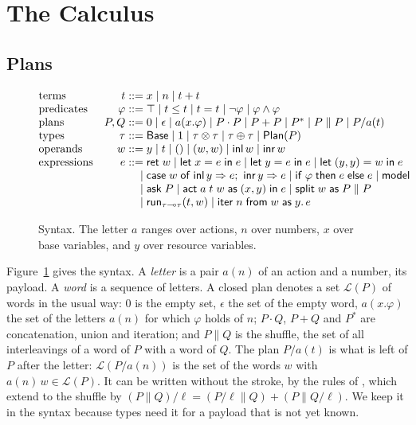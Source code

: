 \documentclass[acmsmall,nonacm,screen]{acmart}
\newcommand{\kw}[1]{\mathsf{#1}}
\newcommand{\Base}{\kw{Base}}
\newcommand{\Plan}[1]{\kw{Plan}(#1)}
\newcommand{\ret}{\kw{ret}\;}
\newcommand{\model}{\kw{model}}
\newcommand{\letin}[3]{\kw{let}\;#1 = #2\;\kw{in}\;#3}
\newcommand{\ite}[3]{\kw{if}\;#1\;\kw{then}\;#2\;\kw{else}\;#3}
\newcommand{\ask}[1]{\kw{ask}\;#1}
\newcommand{\act}[5]{\kw{act}\;#1\;#2\;#3\;\kw{as}\;(#4)\;\kw{in}\;#5}
\newcommand{\splt}[3]{\kw{split}\;#1\;\kw{as}\;#2 \parallel #3}
\newcommand{\run}[4]{\kw{run}_{#1 \multimap #2}(#3, #4)}
\newcommand{\iter}[4]{\kw{iter}\;#1\;\kw{from}\;#2\;\kw{as}\;#3.\,#4}
\newcommand{\inl}{\kw{inl}\,}
\newcommand{\inr}{\kw{inr}\,}
\newcommand{\lang}[1]{\mathcal{L}(#1)}
\begin{document}
\section{The Calculus}
\label{sec:calculus}

\subsection{Plans}

\begin{figure}[t]
\[
\begin{array}{@{}l@{\quad}r@{\;}l@{}}
\text{terms} & t ::= & x \mid n \mid t + t \\
\text{predicates} & \varphi ::= & \top \mid t \le t \mid t = t \mid \neg\varphi \mid \varphi \wedge \varphi \\
\text{plans} & P, Q ::= & 0 \mid \epsilon \mid a(x.\varphi) \mid P \cdot P \mid P + P \mid P^{*} \mid P \parallel P \mid P / a(t) \\
\text{types} & \tau ::= & \Base \mid 1 \mid \tau \otimes \tau \mid \tau \oplus \tau \mid \Plan{P} \\
\text{operands} & w ::= & y \mid t \mid () \mid (w, w) \mid \inl w \mid \inr w \\
\text{expressions} & e ::= & \ret w \mid \letin{x}{e}{e} \mid \letin{y}{e}{e} \mid \letin{(y, y)}{w}{e} \\
 & \mid & \kw{case}\;w\;\kw{of}\;\inl y \Rightarrow e;\ \inr y \Rightarrow e \mid \ite{\varphi}{e}{e} \mid \model \\
 & \mid & \ask{P} \mid \act{a}{t}{w}{x, y}{e} \mid \splt{w}{P}{P} \\
 & \mid & \run{\tau}{\tau}{t}{w} \mid \iter{n}{w}{y}{e}
\end{array}
\]
\caption{Syntax. The letter $a$ ranges over actions, $n$ over numbers, $x$ over base
variables, and $y$ over resource variables.}
\label{fig:syntax}
\end{figure}

Figure~\ref{fig:syntax} gives the syntax. A \emph{letter} is a pair $a(n)$ of an action and
a number, its payload. A \emph{word} is a sequence of letters. A closed plan denotes a set
$\lang{P}$ of words in the usual way: $0$ is the empty set, $\epsilon$ the set of the empty
word, $a(x.\varphi)$ the set of the letters $a(n)$ for which $\varphi$ holds of $n$;
$P \cdot Q$, $P + Q$ and $P^{*}$ are concatenation, union and iteration; and $P \parallel Q$
is the shuffle, the set of all interleavings of a word of $P$ with a word of $Q$. The plan
$P / a(t)$ is what is left of $P$ after the letter: $\lang{P / a(n)}$ is the set of the
words $w$ with $a(n)\,w \in \lang{P}$. It can be written without the stroke, by the rules of
\citet{brzozowski1964}, which extend to the shuffle by
$(P \parallel Q) / \ell = (P / \ell \parallel Q) + (P \parallel Q / \ell)$. We keep it in
the syntax because types need it for a payload that is not yet known.
\end{document}

